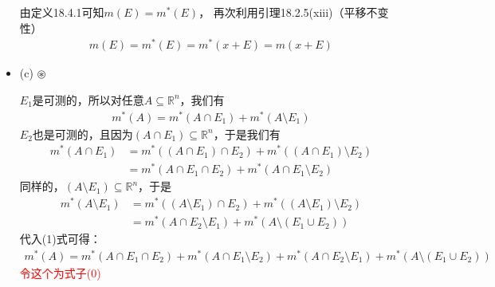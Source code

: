 \documentclass{article}
\begin{document}
\begin{itemize}
        由定义18.4.1可知$m(E) = m^{\ast}(E)$，
        再次利用引理18.2.5(xiii)（平移不变性）
        \begin{align*}
          m(E) = m^{\ast}(E) = m^{\ast}(x + E) = m(x + E)
        \end{align*}

  \item (c) $\circledast$

        $E_1$是可测的，所以对任意$A \subseteq \mathbb{R}^n$，我们有
        \begin{align}
          m^{\ast}(A) = m^{\ast}(A \cap E_1) + m^{\ast}(A \setminus E_1)
        \end{align}
        $E_2$也是可测的，且因为$(A \cap E_1) \subseteq \mathbb{R}^n$，于是我们有
        \begin{align*}
          m^{\ast}(A \cap E_1) & = m^{\ast}((A \cap E_1) \cap E_2) + m^{\ast}((A \cap E_1) \setminus E_2) \\
                               & = m^{\ast}(A \cap E_1 \cap E_2) + m^{\ast}(A \cap E_1 \setminus E_2)
        \end{align*}
        同样的，$(A \setminus E_1) \subseteq \mathbb{R}^n$，于是
        \begin{align*}
          m^{\ast}(A \setminus E_1) & = m^{\ast}((A \setminus E_1) \cap E_2) + m^{\ast}((A \setminus E_1) \setminus E_2) \\
                                    & = m^{\ast}(A \cap E_2 \setminus E_1) + m^{\ast}(A \setminus (E_1 \cup E_2))
        \end{align*}
        代入(1)式可得：
        \begin{align*}
          m^{\ast}(A) = m^{\ast}(A \cap E_1 \cap E_2) + m^{\ast}(A \cap E_1 \setminus E_2) + m^{\ast}(A \cap E_2 \setminus E_1) + m^{\ast}(A \setminus (E_1 \cup E_2))
        \end{align*}
        \textcolor{red}{令这个为式子(0)}


\end{itemize}
\end{document}

